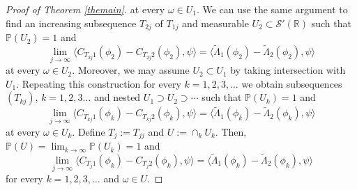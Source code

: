 \documentclass[10pt,a4paper]{article}
\theoremstyle{plain}
\theoremstyle{definition}
\theoremstyle{remark}
\numberwithin{equation}{section}
\newcommand{\R}{\mathbb{R}}
\begin{document}
\begin{proof}[Proof of Theorem \ref{themain}]
at every $\omega \in U_1$. We can use the same argument to find an increasing subsequence $T_{2j}$ of $T_{1j}$ and measurable $U_2  \subset \mathcal{S}'(\R)$ such that $\mathbb{P} (U_2) = 1$ and 
\begin{equation}\label{eqp:991222}
\lim_{j \to \infty} \langle C_{T_{2j}1}(\phi_2)-C_{T_{2j}2}(\phi_2)  , \psi \rangle =  \langle \tilde\Lambda_{1} (\phi_2 )-\tilde\Lambda_{2} (\phi_2 ), \psi \rangle
\end{equation} 
at every $\omega \in U_2$. 
Moreover, we may assume $U_2 \subset U_1$ by 
taking intersection with $U_1$. 
Repeating this construction for every $k=1,2,3,\dots$ we obtain 
subsequences $(T_{kj})$, $k=1,2,3\dots$ and nested 
$U_1  \supset U_{2} \supset  \cdots $ such that $\mathbb{P} (U_k) = 1$ and 
\begin{equation}\label{eqp:991223}
\lim_{j \to \infty} \langle C_{T_{kj}1}(\phi_k)-C_{T_{kj}2}(\phi_k)  , \psi \rangle =  \langle \tilde\Lambda_{1} (\phi_k )-\tilde\Lambda_{2} (\phi_k ), \psi \rangle
\end{equation} 
at every $\omega \in U_k$.  
Define $T_j := T_{jj}$ and $U := \cap_{k} U_k$.
Then, $\mathbb{P} (U) =\lim_{k\to \infty} \mathbb{P} (U_k) = 1$ and 
\begin{equation}\label{eqp:99122}
\lim_{j \to \infty} \langle C_{T_{j}1}(\phi_k)-C_{T_{j}2}(\phi_k)  , \psi \rangle =  \langle \tilde\Lambda_{1} (\phi_k )-\tilde\Lambda_{2} (\phi_k ), \psi \rangle
\end{equation} 
for every $k=1,2,3,\dots$ and $\omega \in U$. 





\end{proof}
\end{document}
